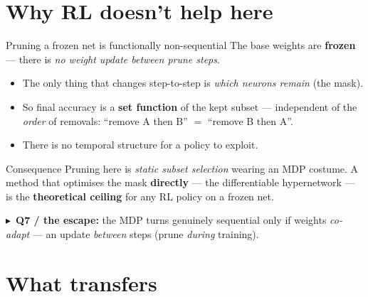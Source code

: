 \documentclass[10pt,aspectratio=169]{beamer}
\newcommand{\tk}[1]{{\scriptsize \textcolor{accent}{$\blacktriangleright$}\ #1}}
\begin{document}
\section{Why RL doesn't help here}

\begin{frame}{Pruning a frozen net is functionally non-sequential}
  The base weights are \textbf{frozen} --- there is \emph{no weight update between prune steps}.
  \vspace{0.4em}
  \begin{itemize}
    \item The only thing that changes step-to-step is \emph{which neurons remain} (the mask).
    \item So final accuracy is a \textbf{set function} of the kept subset --- independent of the \emph{order} of removals: ``remove A then B'' $=$ ``remove B then A''.
    \item There is no temporal structure for a policy to exploit.
  \end{itemize}
  \vspace{0.5em}
  \begin{block}{Consequence}
    Pruning here is \emph{static subset selection} wearing an MDP costume. A method that optimises the mask \textbf{directly} --- the differentiable hypernetwork --- is the \textbf{theoretical ceiling} for any RL policy on a frozen net.
  \end{block}
  \vspace{0.3em}
  \tk{\textbf{Q7 / the escape:} the MDP turns genuinely sequential only if weights \emph{co-adapt} --- an update \emph{between} steps (prune \emph{during} training).}
\end{frame}

\section{What transfers}
\end{document}
